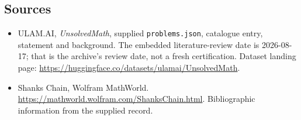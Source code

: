\documentclass[11pt,a4paper]{article}
\begin{document}
\subsection{Sources}

{\small

\begin{itemize}

\item[\hypertarget{source:statement:1}{S1}] ULAM.AI, \emph{UnsolvedMath}, supplied \texttt{problems.json}, catalogue entry, statement and background. The embedded literature-review date is 2026-08-17; that is the archive’s review date, not a fresh certification. Dataset landing page: \url{https://huggingface.co/datasets/ulamai/UnsolvedMath}.

\item[\hypertarget{source:statement:2}{S2}] Shanks Chain, Wolfram MathWorld. \url{https://mathworld.wolfram.com/ShanksChain.html}. Bibliographic information from the supplied record.

\end{itemize}

}

\label{end:statement}
\end{document}
